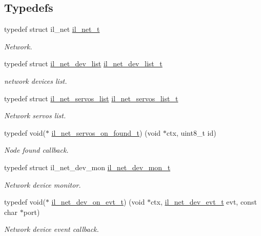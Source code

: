 \subsection*{Typedefs}
\begin{DoxyCompactItemize}
\item 
typedef struct il\+\_\+net \hyperlink{group__IL__NET_ga0657204ab779a5b7a504aa0b895d1ae6}{il\+\_\+net\+\_\+t}
\begin{DoxyCompactList}\small\item\em Network. \end{DoxyCompactList}\item 
typedef struct \hyperlink{structil__net__dev__list}{il\+\_\+net\+\_\+dev\+\_\+list} \hyperlink{group__IL__NET_ga9c0173ee0e17218e9f6dcc5ae0a6f74d}{il\+\_\+net\+\_\+dev\+\_\+list\+\_\+t}
\begin{DoxyCompactList}\small\item\em network devices list. \end{DoxyCompactList}\item 
typedef struct \hyperlink{structil__net__servos__list}{il\+\_\+net\+\_\+servos\+\_\+list} \hyperlink{group__IL__NET_ga81660630b147245b0a160f13ef465811}{il\+\_\+net\+\_\+servos\+\_\+list\+\_\+t}
\begin{DoxyCompactList}\small\item\em Network servos list. \end{DoxyCompactList}\item 
typedef void($\ast$ \hyperlink{group__IL__NET_ga4ba09545bd04fa6df4f0a26f14df84f7}{il\+\_\+net\+\_\+servos\+\_\+on\+\_\+found\+\_\+t}) (void $\ast$ctx, uint8\+\_\+t id)
\begin{DoxyCompactList}\small\item\em Node found callback. \end{DoxyCompactList}\item 
typedef struct il\+\_\+net\+\_\+dev\+\_\+mon \hyperlink{group__IL__NET_ga732e586d3465268782c0c227056736e5}{il\+\_\+net\+\_\+dev\+\_\+mon\+\_\+t}\hypertarget{group__IL__NET_ga732e586d3465268782c0c227056736e5}{}\label{group__IL__NET_ga732e586d3465268782c0c227056736e5}

\begin{DoxyCompactList}\small\item\em Network device monitor. \end{DoxyCompactList}\item 
typedef void($\ast$ \hyperlink{group__IL__NET_ga86bfa409239ad771481bd4dd1a451367}{il\+\_\+net\+\_\+dev\+\_\+on\+\_\+evt\+\_\+t}) (void $\ast$ctx, \hyperlink{group__IL__NET_ga6e78452befa7532716d8035eb293bc10}{il\+\_\+net\+\_\+dev\+\_\+evt\+\_\+t} evt, const char $\ast$port)
\begin{DoxyCompactList}\small\item\em Network device event callback. \end{DoxyCompactList}\end{DoxyCompactItemize}

